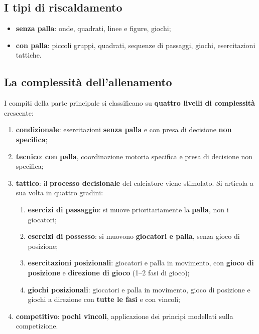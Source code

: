 \subsection{I tipi di riscaldamento}

\begin{itemize}
  \item \textbf{senza palla}: onde, quadrati, linee e figure, giochi;
  \item \textbf{con palla}: piccoli gruppi, quadrati, sequenze di passaggi, giochi, esercitazioni
    tattiche.
\end{itemize}

\subsection{La complessità dell'allenamento}

I compiti della parte principale si classificano su \textbf{quattro livelli di complessità}
crescente:

\begin{enumerate}
  \item \textbf{condizionale}: esercitazioni \textbf{senza palla} e con presa di decisione
    \textbf{non specifica};
  \item \textbf{tecnico}: \textbf{con palla}, coordinazione motoria specifica e presa di decisione
    non specifica;
  \item \textbf{tattico}: il \textbf{processo decisionale} del calciatore viene stimolato. Si
    articola a sua volta in quattro gradini:
    \begin{enumerate}
      \item \textbf{esercizi di passaggio}: si muove prioritariamente la \textbf{palla}, non i
        giocatori;
      \item \textbf{esercizi di possesso}: si muovono \textbf{giocatori e palla}, senza gioco di
        posizione;
      \item \textbf{esercitazioni posizionali}: giocatori e palla in movimento, con
        \textbf{gioco di posizione} e \textbf{direzione di gioco} (1--2 fasi di gioco);
      \item \textbf{giochi posizionali}: giocatori e palla in movimento, gioco di posizione e giochi
        a direzione con \textbf{tutte le fasi} e con vincoli;
    \end{enumerate}
  \item \textbf{competitivo}: \textbf{pochi vincoli}, applicazione dei principi modellati sulla
    competizione.
\end{enumerate}

